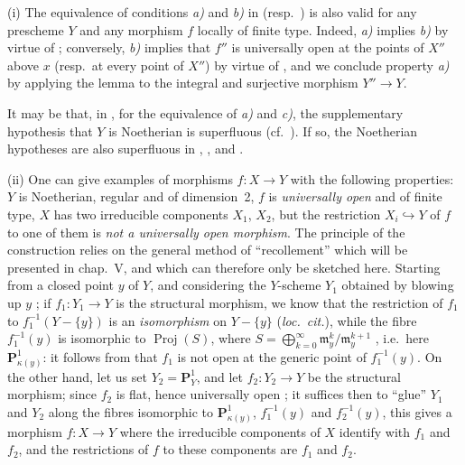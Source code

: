\begin{remarks}[14.4.10]
\label{IV.14.4.10}
(i) The equivalence of conditions \emph{a)} and \emph{b)} in  (resp.\ ) is also valid for any prescheme $Y$ and any morphism $f$ locally of finite type.
Indeed, \emph{a)} implies \emph{b)} by virtue of ; conversely, \emph{b)} implies that $f''$ is universally open at the points of $X''$ above $x$ (resp.\ at every point of $X''$) by virtue of , and we conclude property \emph{a)} by applying the lemma  to the integral and surjective morphism $Y''\to Y$.

It may be that, in , for the equivalence of \emph{a)} and \emph{c)}, the supplementary hypothesis that $Y$ is Noetherian is superfluous (cf.\ ).
If so, the Noetherian hypotheses are also superfluous in , ,  and .

(ii) One can give examples of morphisms $f:X\to Y$ with the following properties: $Y$ is Noetherian, regular and of dimension~2, $f$ is \emph{universally open} and of finite type, $X$ has two irreducible components $X_1$, $X_2$, but the restriction $X_i\hookrightarrow Y$ of $f$ to one of them is \emph{not a universally open morphism}.
The principle of the construction relies on the general method of ``recollement'' which will be presented in chap.~V, and which can therefore only be sketched here.
Starting from a closed point $y$ of $Y$, and considering the $Y$-scheme $Y_1$ obtained by blowing up $y$ ; if $f_1:Y_1\to Y$ is the structural morphism, we know that the restriction of $f_1$ to $f_1^{-1}(Y-\{y\})$ is an \emph{isomorphism} on $Y-\{y\}$ (\emph{loc.\ cit.}), while the fibre $f_1^{-1}(y)$ is isomorphic to $\operatorname{Proj}(S)$, where $S=\bigoplus_{k=0}^{\infty}\mathfrak{m}_y^k/\mathfrak{m}_y^{k+1}$ , i.e.\ here $\mathbf{P}^1_{\kappa(y)}$: it follows from  that $f_1$ is not open at the generic point of $f_1^{-1}(y)$.
On the other hand, let us set $Y_2=\mathbf{P}^1_Y$, and let $f_2:Y_2\to Y$ be the structural morphism; since $f_2$ is flat, hence universally open ; it suffices then to ``glue'' $Y_1$ and $Y_2$ along the fibres isomorphic to $\mathbf{P}^1_{\kappa(y)}$, $f_1^{-1}(y)$ and $f_2^{-1}(y)$, this gives a morphism $f:X\to Y$ where the irreducible components of $X$ identify with $f_1$ and $f_2$, and the restrictions of $f$ to these components are $f_1$ and $f_2$.


\end{remarks}
